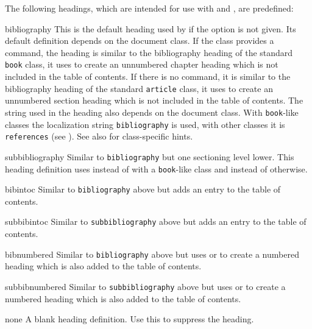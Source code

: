 The following headings, which are intended for use with  and , are predefined:

\begin{valuelist*}

\item[bibliography]
This is the default heading used by  if the  option is not given. Its default definition depends on the document class. If the class provides a  command, the heading is similar to the bibliography heading of the standard \latex \texttt{book} class, \ie it uses  to create an unnumbered chapter heading which is not included in the table of contents. If there is no  command, it is similar to the bibliography heading of the standard \latex \texttt{article} class, \ie it uses  to create an unnumbered section heading which is not included in the table of contents. The string used in the heading also depends on the document class. With \texttt{book}-like classes the localization string \texttt{bibliography} is used, with other classes it is \texttt{references} (see ). See also  for class-specific hints.

\item[subbibliography]
Similar to \texttt{bibliography} but one sectioning level lower. This heading definition uses  instead of  with a \texttt{book}-like class and  instead of  otherwise.

\item[bibintoc]
Similar to \texttt{bibliography} above but adds an entry to the table of contents.

\item[subbibintoc]
Similar to \texttt{subbibliography} above but adds an entry to the table of contents.

\item[bibnumbered]
Similar to \texttt{bibliography} above but uses  or  to create a numbered heading which is also added to the table of contents.

\item[subbibnumbered]
Similar to \texttt{subbibliography} above but uses  or  to create a numbered heading which is also added to the table of contents.

\item[none]
A blank heading definition. Use this to suppress the heading.

\end{valuelist*}

